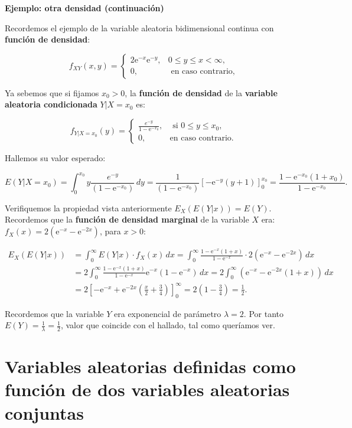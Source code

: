 \documentclass[
  letterpaper,
  DIV=11,
  numbers=noendperiod]{scrreprt}
\begin{document}
\textbf{Ejemplo: otra densidad (continuación)}

Recordemos el ejemplo de la variable aleatoria bidimensional continua
con \textbf{función de densidad}:

\[
f_{XY}(x,y)=\begin{cases}
2 \mathrm{e}^{-x}\mathrm{e}^{-y}, & 0\leq y\leq x < \infty,\\
0, & \mbox{ en caso contrario,}
\end{cases}
\]

Ya sebemos que si fijamos \(x_0>0\), la \textbf{función de densidad} de
la \textbf{variable aleatoria condicionada} \(Y|X=x_0\) es:

\[
f_{Y|X=x_0}(y)=\begin{cases}
\frac{e^{-y}}{1-\mathrm{e}^{-x_0}}, & \mbox{ si }0\leq y\leq x_0, \\
0, & \mbox{en caso contrario.}
\end{cases}
\]

Hallemos su valor esperado:

\[
E(Y|X=x_0)=\int_0^{x_0} y \frac{e^{-y}}{(1-\mathrm{e}^{-x_0})}\, dy=\frac{1}{(1-\mathrm{e}^{-x_0})}\left[-\mathrm{e}^{-y} (y+1)\right]_0^{x_0} = \frac{1-\mathrm{e}^{-x_0}(1+x_0)}{1-\mathrm{e}^{-x_0}}.
\]

Verifiquemos la propiedad vista anteriormente \(E_X(E(Y|x))=E(Y)\).
Recordemos que la \textbf{función de densidad marginal} de la variable
\(X\) era: \(f_X(x)=2\left(\mathrm{e}^{-x}-\mathrm{e}^{-2x}\right)\),
para \(x>0\):

\[
\begin{array}{rl}
E_X(E(Y|x)) & =\int_0^\infty E(Y|x)\cdot f_X(x)\, dx = \int_0^\infty \frac{1-\mathrm{e}^{-x}(1+x)}{1-\mathrm{e}^{-x}}\cdot 2\left(\mathrm{e}^{-x}-\mathrm{e}^{-2x}\right)\, dx 
\\ & =  2\int_0^\infty \frac{1-\mathrm{e}^{-x}(1+x)}{1-\mathrm{e}^{-x}} \mathrm{e}^{-x}\left(1-\mathrm{e}^{-x}\right)\, dx = 2 \int_0^\infty \left(\mathrm{e}^{-x}-\mathrm{e}^{-2x}(1+x)\right)\, dx \\ & = 2\left[-\mathrm{e}^{-x}+\mathrm{e}^{-2 x}
   \left(\frac{x}{2}+\frac{3}{4}\right)\right]_0^\infty = 2 \left(1-\frac{3}{4}\right)=\frac{1}{2}.
\end{array}
\]

Recordemos que la variable \(Y\) era exponencial de parámetro
\(\lambda=2\). Por tanto \(E(Y)=\frac{1}{\lambda}=\frac{1}{2}\), valor
que coincide con el hallado, tal como queríamos ver.

\hypertarget{variables-aleatorias-definidas-como-funciuxf3n-de-dos-variables-aleatorias-conjuntas}{%
\section{Variables aleatorias definidas como función de dos variables
aleatorias
conjuntas}\label{variables-aleatorias-definidas-como-funciuxf3n-de-dos-variables-aleatorias-conjuntas}}
\end{document}
